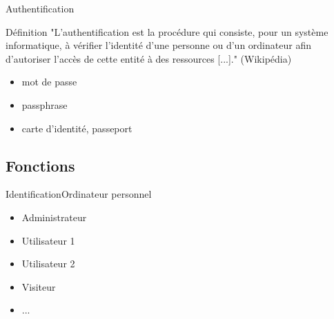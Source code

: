 \documentclass[12pt]{beamer}
\begin{document}
		\begin{frame}{Authentification}
			\onslide<1->
			\begin{exampleblock}{Définition}
				"L'\alert{authentification} est la procédure qui consiste, pour un système informatique, 
				à vérifier l'identité d'une personne ou d'un ordinateur afin d'autoriser l'accès de cette entité 
				à des ressources [...]." (Wikipédia)
			\end{exampleblock}
			\begin{itemize}
				\item mot de passe
				\item passphrase
				\item carte d'identité, passeport
			\end{itemize}
		\end{frame}
		
	\subsection{Fonctions}
		
		\begin{frame}{Identification}{Ordinateur personnel}
			\begin{itemize}
				\item Administrateur
				\item Utilisateur 1
				\item Utilisateur 2
				\item Visiteur
				\item ...
			\end{itemize}
		\end{frame}
		
\end{document}
